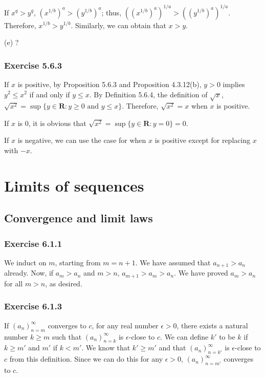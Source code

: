 \documentclass[12pt, oneside]{book}
\begin{document}
	If $x^q > y^q$, $(x^{1 / b})^a > (y^{1 / b})^a$; thus, $((x^{1 / b})^a)^{1 / a} > ((y^{1 / b})^a)^{1 / a}$. Therefore, $x^{1 / b} > y^{1 / b}$. Similarly, we can obtain that $x > y$.
	
	\bigskip
	\noindent (e) ?
	
	\subsection*{Exercise 5.6.3}
	
	If $x$ is positive, by Proposition 5.6.3 and Proposition 4.3.12(b), $y > 0$ implies $y^2 \le x^2$ if and only if $y \le x$. By Definition 5.6.4, the definition of $\sqrt{x}$, $\sqrt{x^2} = \sup \{y \in \mathbf{R}: y \ge 0 \text{ and } y \le x\}$. Therefore, $\sqrt{x^2} = x$ when $x$ is positive.
	
	If $x$ is $0$, it is obvious that $\sqrt{x^2} = \sup \{y \in \mathbf{R}: y = 0\} = 0$.
	
	If $x$ is negative, we can use the case for when $x$ is positive except for replacing $x$ with $-x$.
	
	\chapter{Limits of sequences}
	
	\section{Convergence and limit laws}
	
	\subsection*{Exercise 6.1.1}
	
	We induct on $m$, starting from $m = n + 1$. We have assumed that $a_{n + 1} > a_n$ already. Now, if $a_m > a_n$ and $m > n$, $a_{m + 1} > a_m > a_n$. We have proved $a_m > a_n$ for all $m > n$, as desired.
	
	\subsection*{Exercise 6.1.3}
	
	If $(a_n)_{n = m}^\infty$ converges to $c$, for any real number $\epsilon > 0$, there exists a natural number $k \ge m$ such that $(a_n)_{n = k}^\infty$ is $\epsilon$-close to $c$. We can define $k'$ to be $k$ if $k \ge m'$ and $m'$ if $k < m'$. We know that $k' \ge m'$ and that $(a_n)_{n = k'}^\infty$ is $\epsilon$-close to $c$ from this definition. Since we can do this for any $\epsilon > 0$, $(a_n)_{n = m'}^\infty$ converges to $c$.
	
\end{document}
